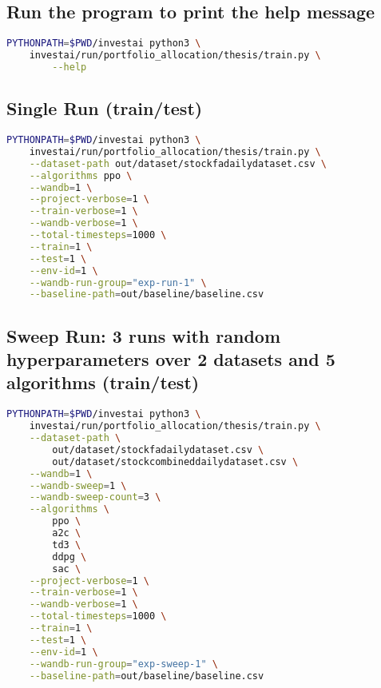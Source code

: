 \documentclass[../xlapes02]{subfiles}
\begin{document}
    \subsection{Run the program to print the help message}
    \begin{lstlisting}[language=bash]
PYTHONPATH=$PWD/investai python3 \
    investai/run/portfolio_allocation/thesis/train.py \
        --help
    \end{lstlisting}

    \subsection{Single Run (train/test)}
    \begin{lstlisting}[language=bash]
PYTHONPATH=$PWD/investai python3 \
    investai/run/portfolio_allocation/thesis/train.py \
    --dataset-path out/dataset/stockfadailydataset.csv \
    --algorithms ppo \
    --wandb=1 \
    --project-verbose=1 \
    --train-verbose=1 \
    --wandb-verbose=1 \
    --total-timesteps=1000 \
    --train=1 \
    --test=1 \
    --env-id=1 \
    --wandb-run-group="exp-run-1" \
    --baseline-path=out/baseline/baseline.csv
    \end{lstlisting}

    \subsection{Sweep Run: 3 runs with random hyperparameters over 2 datasets and 5 algorithms (train/test)}
    \begin{lstlisting}[language=bash]
PYTHONPATH=$PWD/investai python3 \
    investai/run/portfolio_allocation/thesis/train.py \
    --dataset-path \
        out/dataset/stockfadailydataset.csv \
        out/dataset/stockcombineddailydataset.csv \
    --wandb=1 \
    --wandb-sweep=1 \
    --wandb-sweep-count=3 \
    --algorithms \
        ppo \
        a2c \
        td3 \
        ddpg \
        sac \
    --project-verbose=1 \
    --train-verbose=1 \
    --wandb-verbose=1 \
    --total-timesteps=1000 \
    --train=1 \
    --test=1 \
    --env-id=1 \
    --wandb-run-group="exp-sweep-1" \
    --baseline-path=out/baseline/baseline.csv
    \end{lstlisting}
\end{document}
